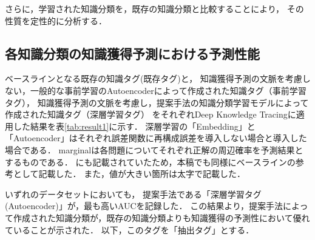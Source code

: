 さらに，学習された知識分類を，既存の知識分類と比較することにより，
その性質を定性的に分析する．



\subsection{各知識分類の知識獲得予測における予測性能}

\begin{table}[!htb]
\caption{各知識分類の知識獲得予測における予測性能}
\label{tab:result1}
\begin{center}
\end{center}
\end{table}


ベースラインとなる既存の知識タグ(既存タグ)と，
知識獲得予測の文脈を考慮しない，一般的な事前学習のAutoencoderによって作成された知識タグ（事前学習タグ），
知識獲得予測の文脈を考慮し，提案手法の知識分類学習モデルによって作成された知識タグ（深層学習タグ）
をそれぞれDeep Knowledge Tracingに適用した結果を表\ref{tab:result1}に示す．
深層学習の「Embedding」と「Autoencoder」はそれぞれ誤差関数に再構成誤差を導入しない場合と導入した場合である．
marginalは各問題についてそれぞれ正解の周辺確率を予測結果とするものである．
\cite{piech2015deep}にも記載されていたため，本稿でも同様にベースラインの参考として記載した．
また，値が大きい箇所は太字で記載した．

いずれのデータセットにおいても，
提案手法である「深層学習タグ(Autoencoder)」が，最も高いAUCを記録した．
この結果より，提案手法によって作成された知識分類が，既存の知識分類よりも知識獲得の予測性において優れていることが示された．
以下，このタグを「抽出タグ」とする．


